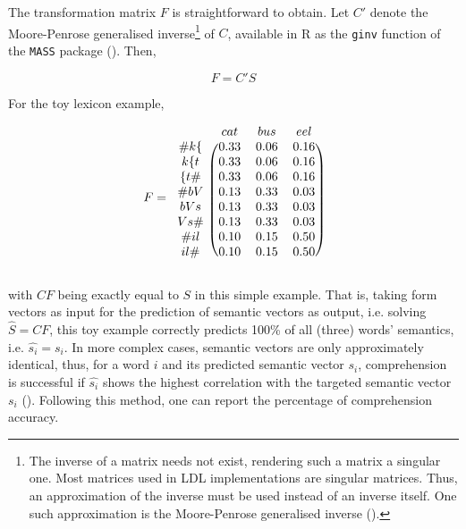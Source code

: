 The transformation matrix $F$ is straightforward to obtain. Let $C'$ denote the Moore-Penrose generalised inverse\footnote{The inverse of a matrix needs not exist, rendering such a matrix a singular one. Most matrices used in LDL implementations are singular matrices. Thus, an approximation of the inverse must be used instead of an inverse itself. One such approximation is the Moore-Penrose generalised inverse (\cite{Moore1920, Penrose1955}).} of $C$, available in R as the \texttt{ginv} function of the \texttt{MASS} package (\cite{Venables2002}). Then,

\begin{equation}
\label{eq:FCS}
    F=C'S
\end{equation}

For the toy lexicon example,

\begin{equation}
\label{eq:Fmat}
  F = 
    \begin{blockarray}{cccc}
        & cat & bus & eel \\
      \begin{block}{c(ccc)}
        {\#k\{} & 0.33 & 0.06 & 0.16 \\
        {k\{t} & 0.33 & 0.06 & 0.16 \\
        {\{t\#} & 0.33 & 0.06 & 0.16 \\
        {\#bV} & 0.13 & 0.33 & 0.03 \\
        {bVs} & 0.13 & 0.33 & 0.03 \\
        {Vs\#} & 0.13 & 0.33 & 0.03 \\
        {\#il} & 0.10 & 0.15 & 0.50 \\
        {il\#} & 0.10 & 0.15 & 0.50 \\
      \end{block}
    \end{blockarray}
\end{equation}

with $CF$ being exactly equal to $S$ in this simple example. That is, taking form vectors as input for the prediction of semantic vectors as output, i.e. solving 
$\hat{S}=CF$, this toy example correctly predicts 100\% of all (three) words’ semantics, i.e. $\hat{s_i}=s_i$. In more complex cases, semantic vectors are only approximately identical, thus, for a word $i$ and its predicted semantic vector $s_i$, comprehension is successful if $\hat{s_i}$ shows the highest correlation with the targeted semantic vector $s_i$ (\cite{Baayen2019}). Following this method, one can report the percentage of comprehension accuracy.

